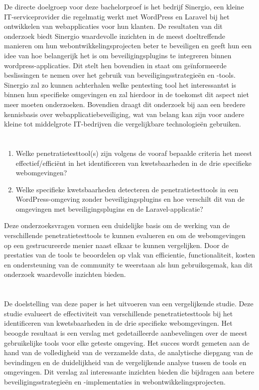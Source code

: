 De directe doelgroep voor deze bachelorproef is het bedrijf Sinergio, een kleine IT-serviceprovider die regelmatig 
werkt met WordPress en Laravel bij het ontwikkelen van webapplicaties voor hun klanten. De resultaten van dit 
onderzoek biedt Sinergio waardevolle inzichten in de meest doeltreffende manieren om hun webontwikkelingsprojecten beter 
te beveiligen en geeft hun een idee van hoe belangerijk het is om beveiligingsplugins te integreren binnen wordpress-applicaties. 
Dit stelt hen bovendien in staat om geïnformeerde beslissingen te nemen over het gebruik van 
beveiligingsstrategieën en -tools. Sinergio zal zo kunnen achterhalen welke pentesting tool het interessantst is 
binnen hun specifieke omgevingen en zal hierdoor in de toekomst dit aspect niet meer moeten onderzoeken.
Bovendien draagt dit onderzoek bij aan een bredere kennisbasis over webapplicatiebeveiliging, 
wat van belang kan zijn voor andere kleine tot middelgrote IT-bedrijven die vergelijkbare technologieën gebruiken.

\section{}%
\label{sec:onderzoeksvraag}
\begin{enumerate}
  \item Welke penetratietesttool(s) zijn volgens de vooraf bepaalde criteria het meest effectief/efficiënt in het identificeren van kwetsbaarheden in de drie specifieke webomgevingen?
  \item Welke specifieke kwetsbaarheden detecteren de penetratietesttools in een WordPress-omgeving zonder beveiligingsplugins en hoe verschilt dit van de omgevingen met beveiligingsplugins en de Laravel-applicatie? 
\end{enumerate}
Deze onderzoeksvragen vormen een duidelijke basis om de werking van de verschillende penetratietesttools te kunnen evalueren 
en om de webomgevingen op een gestrucureerde menier naast elkaar te kunnen vergelijken. Door de prestaties van de 
tools te beoordelen op vlak van efficientie, functionaliteit, kosten en ondersteuning van de community te weerstaan als hun gebruiksgemak, 
kan dit onderzoek waardevolle inzichten bieden.

\section{}%
\label{sec:onderzoeksdoelstelling}
De doelstelling van deze paper is het uitvoeren van een vergelijkende studie. Deze studie evalueert de effectiviteit van 
verschillende penetratietesttools bij het identificeren van kwetsbaarheden in de drie specifieke webomgevingen.
Het beoogde resultaat is een verslag met gedetailleerde aanbevelingen over de meest gebruikelijke tools voor elke geteste 
omgeving. Het succes wordt gemeten aan de hand van de volledigheid van de verzamelde data, de analytische diepgang van de bevindingen 
en de duidelijkheid van de vergelijkende analyse tussen de tools en omgevingen. Dit verslag zal interessante inzichten bieden die 
bijdragen aan betere beveiligingsstrategieën en -implementaties in webontwikkelingsprojecten.
